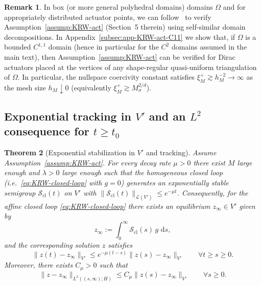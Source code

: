\documentclass[11pt,a4paper]{article}
\numberwithin{equation}{section}
\newtheorem{theorem}{Theorem}[section]
\theoremstyle{definition}
\newtheorem{remark}[theorem]{Remark}
\newcommand{\1}{\mathbbm{1}}
\newcommand{\dd}{\,\mathrm{d}}
\begin{document}
\begin{remark}
In box (or more general polyhedral domains) domains $\Omega$ and for appropriately distributed actuator points, we can follow~\cite{KunRodWal24-cocv}
to verify Assumption~\ref{assump:KRW-act} (Section~5 therein) using self-similar domain decompositions.
In Appendix~\ref{subsec:app-KRW-act-C11} we show that, if $\Omega$ is a bounded $C^{1,1}$ domain (hence in particular
for the $C^2$ domains assumed in the main text), then Assumption~\ref{assump:KRW-act} can be verified for Dirac actuators
placed at the vertices of any shape-regular quasi-uniform triangulation of $\Omega$. In particular,
the nullspace coercivity constant satisfies $\xi_M^+\gtrsim h_M^{-2}\to\infty$ as the mesh size $h_M\downarrow 0$ (equivalently
$\xi_M^+\gtrsim M_\sigma^{2/d}$).
\end{remark}

\subsection{Exponential tracking in $V'$ and an $L^2$ consequence for $t\ge t_0$}

\begin{theorem}[Exponential stabilization in $V'$ and tracking]
\label{thm:KRW-Vprime}
Assume Assumption~\ref{assump:KRW-act}. For every decay rate $\mu>0$ there exist $M$ large enough
and $\lambda>0$ large enough such that the \emph{homogeneous} closed loop (i.e.\ \eqref{eq:KRW-closed-loop}
with $g=0$) generates an exponentially stable semigroup $\mathcal{S}_{\mathrm{cl}}(t)$ on $V'$ with
$\|\mathcal{S}_{\mathrm{cl}}(t)\|_{\mathcal{L}(V')} \le e^{-\mu t}$. Consequently, for the affine closed loop
\eqref{eq:KRW-closed-loop} there exists an equilibrium $z_\infty\in V'$ given by
\begin{equation}
\label{eq:z-infty}
z_\infty := \int_0^\infty \mathcal{S}_{\mathrm{cl}}(s)\,g\,\dd s,
\end{equation}
and the corresponding solution $z$ satisfies
\begin{equation}
\label{eq:Vprime-decay}
\|z(t)-z_\infty\|_{V'} \le e^{-\mu (t-s)} \|z(s)-z_\infty\|_{V'}\qquad \forall t\ge s\ge 0.
\end{equation}
Moreover, there exists $C_\mu>0$ such that
\begin{equation}
\label{eq:L2-time-bound}
\|z-z_\infty\|_{L^2((s,\infty);H)} \le C_\mu \|z(s)-z_\infty\|_{V'}\qquad \forall s\ge 0.
\end{equation}
\end{theorem}
\end{document}
